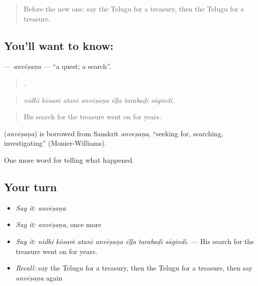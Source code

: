 \label{lesson:TE-C366-anvesana}



\begin{quote}
Before the new one: say the Telugu for a treasury, then the Telugu for a treasure.
\end{quote}

\subsection*{You'll want to know: }
\textbf{} — \emph{anvēṣaṇa} — \textquotedblleft{}a quest; a search\textquotedblright{}.

\begin{quote}
      .
\end{quote}

\begin{quote}
\emph{nidhi kōsaṁ atani anvēṣaṇa ēḷḷa tarabaḍi sāgindi.}
\end{quote}

\begin{quote}
His search for the treasure went on for years.
\end{quote}

\begin{cousinweb}
\textbf{} (\emph{anvēṣaṇa}) is borrowed from Sanskrit \emph{anveṣaṇa}, \textquotedblleft{}seeking for, searching, investigating\textquotedblright{} (Monier-Williams).
\end{cousinweb}

\begin{grammarlens}[title={What you've built}]
One more word for telling what happened.
\end{grammarlens}

\subsection*{Your turn}
\begin{itemize}
\raggedright
  \item \emph{Say it:} \emph{anvēṣaṇa}
  \item \emph{Say it:} \emph{anvēṣaṇa}, once more
  \item \emph{Say it:} \emph{nidhi kōsaṁ atani anvēṣaṇa ēḷḷa tarabaḍi sāgindi.} — His search for the treasure went on for years.
  \item \emph{Recall:} say the Telugu for a treasury, then the Telugu for a treasure, then say \emph{anvēṣaṇa} again
\end{itemize}

